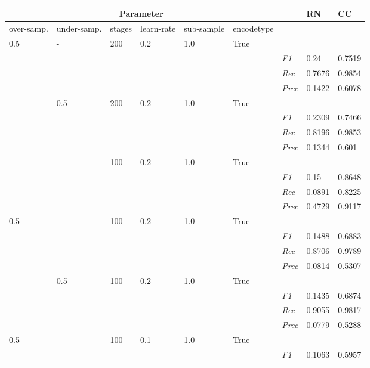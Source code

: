\begin{table}[]
\tiny
\tabcolsep=0.11cm
\begin{tabularx}{\textwidth}{XXXXXX|X|X|X}
\toprule
\multicolumn{6}{c}{Parameter} & & RN &  CC \\ \midrule
over-\newline samp. & under-\newline samp. & stages &learn-\newline rate & sub-\newline sample & encode\newline type & & &  \\ \midrule
0.5 & - & 200 & 0.2 & 1.0 &True & & &  \\
& & & & & & \textit{F1} & 0.24 & 0.7519        \\
& & & & & & \textit{Rec} &  0.7676 & 0.9854    \\
& & & & & & \textit{Prec} & 0.1422 & 0.6078  \\ \midrule
- & 0.5 & 200 & 0.2 & 1.0 &True & & &  \\
& & & & & & \textit{F1} & 0.2309 & 0.7466        \\
& & & & & & \textit{Rec} &  0.8196 & 0.9853    \\
& & & & & & \textit{Prec} & 0.1344 & 0.601  \\ \midrule
- & - & 100 & 0.2 & 1.0 &True & & &  \\
& & & & & & \textit{F1} & 0.15 & 0.8648        \\
& & & & & & \textit{Rec} &  0.0891 & 0.8225    \\
& & & & & & \textit{Prec} & 0.4729 & 0.9117  \\ \midrule
0.5 & - & 100 & 0.2 & 1.0 &True & & &  \\
& & & & & & \textit{F1} & 0.1488 & 0.6883        \\
& & & & & & \textit{Rec} &  0.8706 & 0.9789    \\
& & & & & & \textit{Prec} & 0.0814 & 0.5307  \\ \midrule
- & 0.5 & 100 & 0.2 & 1.0 &True & & &  \\
& & & & & & \textit{F1} & 0.1435 & 0.6874        \\
& & & & & & \textit{Rec} &  0.9055 & 0.9817    \\
& & & & & & \textit{Prec} & 0.0779 & 0.5288  \\ \midrule
0.5 & - & 100 & 0.1 & 1.0 &True & & &  \\
& & & & & & \textit{F1} & 0.1063 & 0.5957        \\

\end{tabularx}
\end{table}
